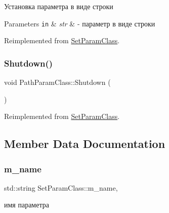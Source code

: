 Установка параметра в виде строки 


\begin{DoxyParams}[1]{Parameters}
\mbox{\tt in}  & {\em str} & -\/ параметр в виде строки \\
\hline
\end{DoxyParams}


Reimplemented from \hyperlink{class_set_param_class_aabba4e8a9b148582f40486e662408bf9}{Set\+Param\+Class}.

\mbox{\label{class_path_param_class_a24f272557eaa32ca6ee758932a7e5a97}} 
\subsubsection{\texorpdfstring{Shutdown()}{Shutdown()}}
{\footnotesize\ttfamily void Path\+Param\+Class\+::\+Shutdown (\begin{DoxyParamCaption}{ }\end{DoxyParamCaption})\hspace{0.3cm}{\ttfamily [virtual]}}



Reimplemented from \hyperlink{class_set_param_class_afdb63374ca8c32f6678ba34e050e9071}{Set\+Param\+Class}.



\subsection{Member Data Documentation}
\mbox{\label{class_set_param_class_aab204889210304af482b414a6f8dbe82}} 
\subsubsection{\texorpdfstring{m\+\_\+name}{m\_name}}
{\footnotesize\ttfamily std\+::string Set\+Param\+Class\+::m\+\_\+name\hspace{0.3cm}{\ttfamily [protected]}, {\ttfamily [inherited]}}



имя параметра 

\mbox{\label{class_path_param_class_a91c30c25a16f97df5dc77ac5c6de1d78}} 
